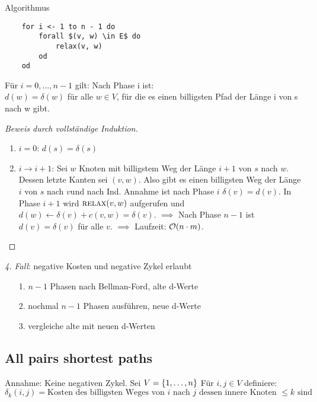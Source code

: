 Algorithmus
\begin{verbatim}
    for i <- 1 to n - 1 do
        forall $(v, w) \in E$ do
            relax(v, w)
        od
    od
\end{verbatim}

        \begin{lemma}
            Für $i=0,...,n-1$ gilt: Nach Phase i ist:\\
            $d(w)=\delta (w)$ für alle $w\in V$, für die es einen billigsten Pfad der Länge i von s nach w gibt.
        \end{lemma}
        \begin{proof}[Beweis durch vollständige Induktion]
            \begin{enumerate}
                \item $i = 0$: $d(s) = \delta(s)$
                \item $i \to i + 1$:
                Sei $w$ Knoten mit billigstem Weg der Länge $i+1$ von $s$ nach $w$. Dessen letzte Kanten sei $(v, w)$. Also gibt es einen
                billigsten Weg der Länge $i$ von $s$ nach $v$und nach Ind. Annahme ist nach Phase $i$ $\delta(v) = d(v)$. In Phase $i+1$ wird $\textsc{relax}(v, w)$ aufgerufen und $d(w) \gets \delta(v) + c(v, w) = \delta(v)$.
                $\implies$ Nach Phase $n - 1$ ist $d(v) = \delta(v)$ für alle $v$.
                $\implies$ Laufzeit: $\mathcal{O}(n \cdot m)$.
            \end{enumerate}
        \end{proof}
				
				\emph{4. Fall}: negative Kosten und negative Zykel erlaubt\\
				\begin{itemize}
					\item[1.] $n-1$ Phasen nach Bellman-Ford, alte d-Werte
					\item[2.] nochmal $n-1$ Phasen ausführen, neue d-Werte
					\item[3.] vergleiche alte mit neuen d-Werten
				\end{itemize}

        \subsection{All pairs shortest paths}
            Annahme: Keine negativen Zykel. Sei $V = \{1, \dots, n\}$
            Für $i, j \in V$ definiere:
            $$
                \delta_k(i, j) = \text{Kosten des billigsten Weges von $i$ nach $j$ dessen innere Knoten $\le k$ sind}
            $$

